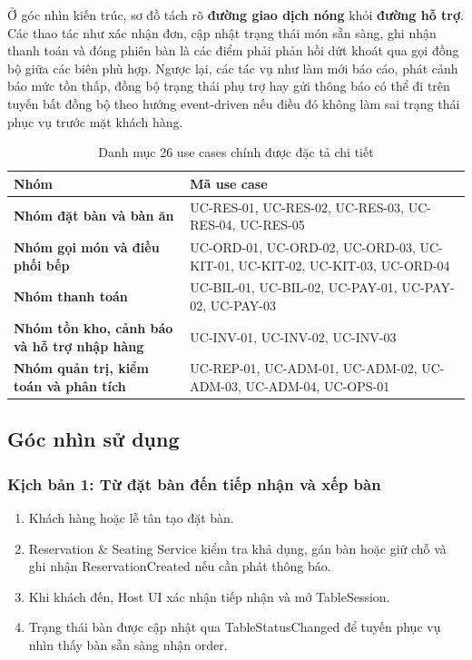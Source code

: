Ở góc nhìn kiến trúc, sơ đồ tách rõ \textbf{đường giao dịch nóng} khỏi \textbf{đường hỗ trợ}. Các thao tác như xác nhận đơn, cập nhật trạng thái món sẵn sàng, ghi nhận thanh toán và đóng phiên bàn là các điểm phải phản hồi dứt khoát qua gọi đồng bộ giữa các biên phù hợp. Ngược lại, các tác vụ như làm mới báo cáo, phát cảnh báo mức tồn thấp, đồng bộ trạng thái phụ trợ hay gửi thông báo có thể đi trên tuyến bất đồng bộ theo hướng event-driven nếu điều đó không làm sai trạng thái phục vụ trước mặt khách hàng.

\begin{table}[H]
\centering
\caption{Danh mục 26 use cases chính được đặc tả chi tiết}
\begin{tabularx}{\textwidth}{>{\bfseries}p{4.0cm} X}
\toprule
Nhóm & Mã use case \\
\midrule
Nhóm đặt bàn và bàn ăn & UC-RES-01, UC-RES-02, UC-RES-03, UC-RES-04, UC-RES-05 \\
Nhóm gọi món và điều phối bếp & UC-ORD-01, UC-ORD-02, UC-ORD-03, UC-KIT-01, UC-KIT-02, UC-KIT-03, UC-ORD-04 \\
Nhóm thanh toán & UC-BIL-01, UC-BIL-02, UC-PAY-01, UC-PAY-02, UC-PAY-03 \\
Nhóm tồn kho, cảnh báo và hỗ trợ nhập hàng & UC-INV-01, UC-INV-02, UC-INV-03 \\
Nhóm quản trị, kiểm toán và phân tích & UC-REP-01, UC-ADM-01, UC-ADM-02, UC-ADM-03, UC-ADM-04, UC-OPS-01 \\
\bottomrule
\end{tabularx}
\end{table}

\subsection{Góc nhìn sử dụng}
\subsubsection{Kịch bản 1: Từ đặt bàn đến tiếp nhận và xếp bàn}
\begin{enumerate}
  \item Khách hàng hoặc lễ tân tạo đặt bàn.
  \item \textsf{Reservation \& Seating Service} kiểm tra khả dụng, gán bàn hoặc giữ chỗ và ghi nhận \textsf{ReservationCreated} nếu cần phát thông báo.
  \item Khi khách đến, \textsf{Host UI} xác nhận tiếp nhận và mở \textsf{TableSession}.
  \item Trạng thái bàn được cập nhật qua \textsf{TableStatusChanged} để tuyến phục vụ nhìn thấy bàn sẵn sàng nhận order.
\end{enumerate}

